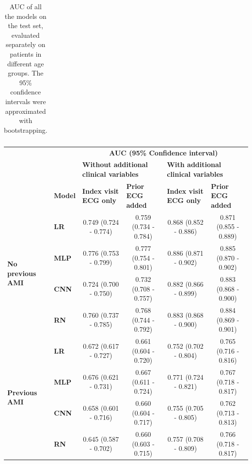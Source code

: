 \documentclass[preprint]{elsarticle}
\begin{document}
\begin{table}[H]
\begin{adjustbox}{center}
\begin{tabular}{@{}llcccc@{}}
\bottomrule
\end{tabular}
\end{adjustbox}
\caption{AUC of all the models on the test set, evaluated separately on patients in different age groups. The 95\% confidence intervals were approximated with bootstrapping.}
\label{table:appendix:age}
\end{table}
\renewcommand{\arraystretch}{1}



\renewcommand{\arraystretch}{1.2}
\begin{table}[H]
  \centering
  \scriptsize
\begin{adjustbox}{center}
\begin{tabular}{@{}llcccc@{}}
  \toprule
  & & \multicolumn{4}{c}{\textbf{AUC (95\% Confidence interval)}} \\
  \cmidrule(lr){3-6}
  & & \multicolumn{2}{l}{\textbf{Without additional clinical variables}} & \multicolumn{2}{l}{\textbf{With additional clinical variables}} \\
  \cmidrule(lr){3-4}\cmidrule(lr){5-6}
  & \multicolumn{1}{l}{\textbf{Model}} & \multicolumn{1}{l}{\textbf{Index visit ECG only}} & \multicolumn{1}{l}{\textbf{Prior ECG added}} & \multicolumn{1}{l}{\textbf{Index visit ECG only}} & \multicolumn{1}{l}{\textbf{Prior ECG added}} \\
  \midrule

\multirow{4}{*}{\begin{minipage}{0.65in}\textbf{No previous AMI}\end{minipage}} %
& \textbf{LR} & 0.749 (0.724 - 0.774) & 0.759 (0.734 - 0.784) & 0.868 (0.852 - 0.886) & 0.871 (0.855 - 0.889) \\
& \textbf{MLP} & 0.776 (0.753 - 0.799) & 0.777 (0.754 - 0.801) & 0.886 (0.871 - 0.902) & 0.885 (0.870 - 0.902) \\
& \textbf{CNN} & 0.724 (0.700 - 0.750) & 0.732 (0.708 - 0.757) & 0.882 (0.866 - 0.899) & 0.883 (0.868 - 0.900) \\
& \textbf{RN} & 0.760 (0.737 - 0.785) & 0.768 (0.744 - 0.792) & 0.883 (0.868 - 0.900) & 0.884 (0.869 - 0.901) \\
  \cmidrule(lr){1-2}
\multirow{4}{*}{\begin{minipage}{0.65in}\textbf{Previous AMI}\end{minipage}} %
& \textbf{LR} & 0.672 (0.617 - 0.727) & 0.661 (0.604 - 0.720) & 0.752 (0.702 - 0.804) & 0.765 (0.716 - 0.816) \\
& \textbf{MLP} & 0.676 (0.621 - 0.731) & 0.667 (0.611 - 0.724) & 0.771 (0.724 - 0.821) & 0.767 (0.718 - 0.817) \\
& \textbf{CNN} & 0.658 (0.601 - 0.716) & 0.660 (0.604 - 0.717) & 0.755 (0.705 - 0.805) & 0.762 (0.713 - 0.813) \\
& \textbf{RN} & 0.645 (0.587 - 0.702) & 0.660 (0.603 - 0.715) & 0.757 (0.708 - 0.809) & 0.766 (0.718 - 0.817) \\


\end{tabular}
\end{adjustbox}
\end{table}
\end{document}
